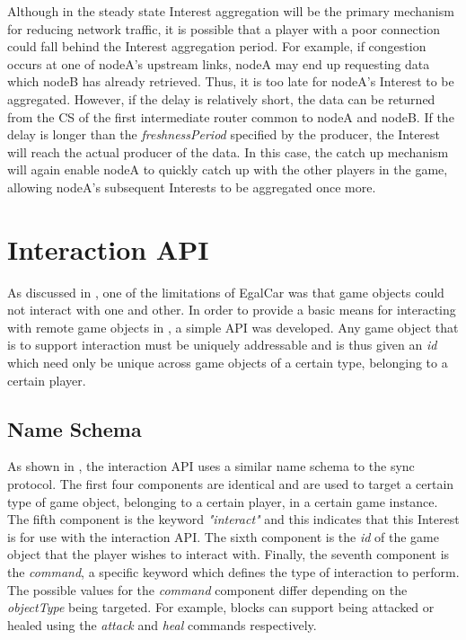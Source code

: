 Although in the steady state Interest aggregation will be the primary mechanism for reducing network traffic, it is possible that a player with a poor connection could fall behind the Interest aggregation period. For example, if congestion occurs at one of nodeA's upstream links, nodeA may end up requesting data which nodeB has already retrieved. Thus, it is too late for nodeA's Interest to be aggregated. However, if the delay is relatively short, the data can be returned from the CS of the first intermediate router common to nodeA and nodeB. If the delay is longer than the \textit{freshnessPeriod} specified by the producer, the Interest will reach the actual producer of the data. In this case, the catch up mechanism will again enable nodeA to quickly catch up with the other players in the game, allowing nodeA's subsequent Interests to be aggregated once more.




\section{\game{} Interaction API}\label{sec:des:interaction}
As discussed in , one of the limitations of EgalCar was that game objects could not interact with one and other. In order to provide a basic means for interacting with remote game objects in \game{}, a simple API was developed. Any game object that is to support interaction must be uniquely addressable and is thus given an \textit{id} which need only be unique across game objects of a certain type, belonging to a certain player.


\subsection{Name Schema}
As shown in , the interaction API uses a similar name schema to the sync protocol. The first four components are identical and are used to target a certain type of game object, belonging to a certain player, in a certain game instance. The fifth component is the keyword \textit{"interact"} and this indicates that this Interest is for use with the interaction API. The sixth component is the \textit{id} of the game object that the player wishes to interact with. Finally, the seventh component is the \textit{command}, a specific keyword which defines the type of interaction to perform. The possible values for the \textit{command} component differ depending on the \textit{objectType} being targeted. For example, blocks can support being attacked or healed using the \textit{attack} and \textit{heal} commands respectively.

